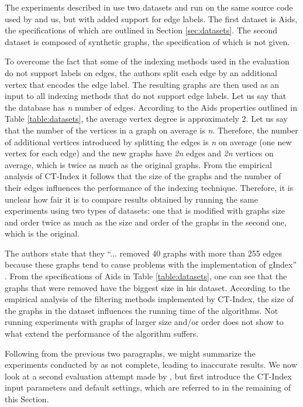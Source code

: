 \documentclass{l4proj}
\begin{document}
The experiments described in \cite{ctindex} use two datasets and run on the same source code used by \cite{foteini} and us, but with added support for edge labels. The first dataset is Aids, the specifications of which are outlined in Section \ref{sec:datasets}. The second dataset is composed of synthetic graphs, the specification of which is not given.

To overcome the fact that some of the indexing methods used in the evaluation do not support labels on edges, the authors split each edge by an additional vertex that encodes the edge label. The resulting graphs are then used as an input to all indexing methods that do not support edge labels. Let us say that the database has \emph{n} number of edges. According to the Aids properties outlined in Table \ref{table:datasets}, the average vertex degree is approximately 2. Let us say that the number of the vertices in a graph on average is \emph{n}. Therefore, the number of additional vertices introduced by splitting the edges is \emph{n} on average (one new vertex for each edge) and the new graphs have \emph{2n} edges and \emph{2n} vertices on average, which is twice as much as the original graphs. From the empirical analysis of CT-Index it follows that the size of the graphs and the number of their edges influences the performance of the indexing technique. Therefore, it is unclear how fair it is to compare results obtained by running the same experiments using two types of datasets: one that is modified with graphs size and order twice as much as the size and order of the graphs in the second one, which is the original.
 
The authors state that they ``... removed 40 graphs with more than 255 edges because these graphs tend to cause problems with the implementation of gIndex'' \cite{ctindex}. From the specifications of Aids in Table \ref{table:datasets}, one can see that the graphs that were removed have the biggest size in his dataset. According to the empirical analysis of the filtering methods implemented by CT-Index, the size of the graphs in the dataset influences the running time of the algorithms. Not running experiments with graphs of larger size and/or order does not show to what extend the performance of the algorithm suffers.

Following from the previous two paragraphs, we might summarize the experiments conducted by \cite{ctindex} as not complete, leading to inaccurate results. We now look at a second evaluation attempt made by \cite{foteini}, but first introduce the CT-Index input parameters and default settings, which are referred to in the remaining of this Section.
\end{document}
